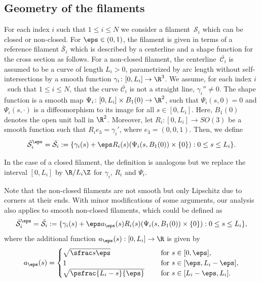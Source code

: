 \subsection{Geometry of the filaments}
For each index $i$ such that $ 1\leq i \leq N$
we consider a filament~$\mathcal S_i$ which can be closed or non-closed.
For $\eps \in (0,1)$, the filament is given in terms of a reference filament $\bar{\mathcal S}_i$ which is described by a centerline and a shape function for the cross section as follows.
For a non-closed filament, the centerline~$\bar {\mathcal C_i}$ is assumed to be a curve of length $L_i >0$, parametrized by arc length without self-intersections by a smooth function $\gamma_i \colon [0,L_i] \to \R^3$.
We assume, for each index $i$~such that $1\leq i \leq N$, that the curve $\bar {\mathcal C_i}$
is not a straight line, \ie $\gamma_i'' \neq 0$.
The shape function is a smooth map $\Psi_i \colon [0,L_i] \times B_1(0) \to \R^2$, such that $\Psi_i(s,0) = 0$ and
$\Psi_i(s,\cdot)$ is a diffeomorphism to its image for all $s \in [0,L_i]$. Here, $B_1(0)$ denotes the open unit ball in $\R^2$. Moreover, let $R_i \colon [0,L_i] \to SO(3)$ be a smooth function such that $R_i e_3 = \gamma_i'$, where $e_3=(0,0,1)$.
Then, we define
\begin{equation} \label{def:S^eps}
{\bar{ \mathcal S}_i^\eps}= \bar{ \mathcal S}_i := \{ \gamma_i(s) + \eps R_i(s)(\Psi_i(s,B_1(0)) \times \{0\}) : 0 \leq s \leq L_i \}.
\end{equation}

In the case of a closed filament, the definition is analogous but we replace the interval $[0,L_i]$ by $\R/L_i \Z$ for $\gamma_i$, $R_i$ and $ \Psi_i$.

\begin{remark} \label{rem:nonclosed.smooth}
Note that the non-closed filaments are not smooth but only Lipschitz due to corners at their ends. With minor modifications of some arguments, our analysis also applies to smooth non-closed filaments, which could be defined as
\begin{equation}
{\bar{ \mathcal S}_i^\eps} = \bar{ \mathcal S}_i := \{ \gamma_i(s) + \eps a_\eps(s) R_i(s)(\Psi_i(s,B_1(0)) \times \{0\}) : 0 \leq s \leq L_i \},
\end{equation}
where the additional function $a_\eps(s) : [0,L_i] \to \R$ is given by
\begin{equation}
a_\eps(s) = \begin{cases}
\sqrt{\sfrac s \eps} &\quad \text { for } s \in [0,\eps], \\
1 &\quad \text { for } s \in [\eps, L_i - \eps], \\
\sqrt{\psfrac{L_i - s}{\eps}} & \quad \text{ for } s \in [L_i-\eps,L_i].
\end{cases}
\end{equation}
\end{remark}

